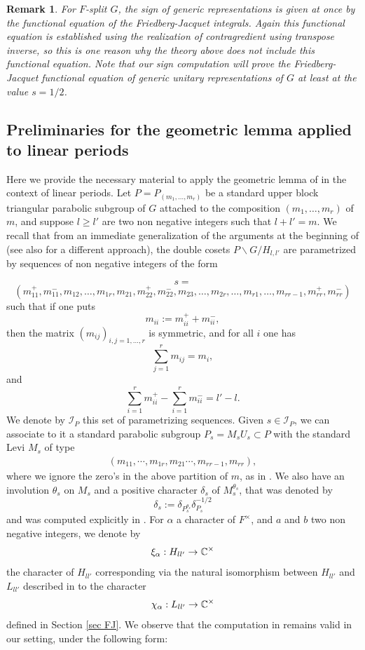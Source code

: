\documentclass[11pt,letterpaper]{amsart}
\newcommand{\CI}{{\mathcal {I}}} \newcommand{\CJ}{{\mathcal {J}}}\newcommand{\CK}{{\mathcal {K}}}\newcommand{\CL}{{\mathcal {L}}}
\theoremstyle{plain}
\newtheorem {rem}[thm]{Remark} \newtheorem{ex}[thm]{Example}
\numberwithin{equation}{section}
\begin{document}
\begin{rem}
For $F$-split $G$, the sign of generic representations is given at once by the functional equation of the Friedberg-Jacquet integrals. Again this functional equation is established using the realization of contragredient using transpose inverse, so this is one reason why the theory above does not include this functional equation. Note that our sign computation will prove the Friedberg-Jacquet functional equation of generic unitary representations of $G$ at least at the value $s=1/2$.  
\end{rem}

\subsection{Preliminaries for the geometric lemma applied to linear periods}\label{sec geom lem prelim}

Here we provide the necessary material to apply the geometric lemma of \cite[Corollary 5.2]{OJNT} in the context of linear periods. Let $P=P_{(m_1,\dots,m_r)}$ be a standard upper block triangular parabolic subgroup of $G$ attached to the composition $(m_1,\dots,m_r)$ of $m$, and suppose $l\geq l'$ are two non negative integers such that $l+l'=m$. We recall that from an immediate generalization of the arguments at the beginning of \cite[Section 3]{MatCRELLE} (see also \cite{Yunitary} for a different approach), the double cosets 
$P\backslash G/ H_{l,l'}$ are parametrized by sequences of non negative integers of the form 

\[s=\] 
\[(m_{11}^+,m_{11}^-,m_{12},\dots, m_{1r}, m_{21},m_{22}^+,m_{22}^-,m_{23},\dots,m_{2r},\dots,m_{r1},\dots,m_{rr-1},m_{rr}^+,m_{rr}^-)\] such that if one puts \[m_{ii}:=m_{ii}^+ + m_{ii}^-,\] then the matrix $(m_{ij})_{i,j=1,\dots,r}$ is symmetric, and for all $i$ one has \[\sum_{j=1}^r m_{ij}=m_i,\] and \[\sum_{i=1}^r m_{ii}^+-\sum_{i=1}^r m_{ii}^-=l'-l.\]
We denote by $\CI_P$ this set of parametrizing sequences. Given $s \in \CI_P$, we can associate to it a standard parabolic subgroup $P_s = M_sU_s \subset P$ with the standard Levi $M_s$ of type
\begin{align*}
	(m_{11},\cdots,m_{1r},m_{21}\cdots,m_{rr-1},m_{rr}),
\end{align*} where we ignore the zero's in the above partition of $m$, as in \cite[Section 3]{MatCRELLE}. 
We also have an involution $\theta_s$ on $M_s$ and a positive character $\delta_s$ of $M_s^{\theta_s}$, that was denoted by 
\[\delta_s:=\delta_{P_s^{\theta_s}} \delta_{P_s}^{-1/2}\] and was computed explicitly in \cite[Proposition 3.6]{MatCRELLE}. For $\alpha$ a character of $F^\times$, and $a$ and $b$ two non negative integers, we denote by 
\[\xi_{\alpha}:H_{ll'}\to {\mathbb {C}}^\times\] the character of $H_{ll'}$ corresponding via the natural isomorphism between $H_{ll'}$ and $L_{ll'}$ described in \cite[Section 2]{MatJNT} to the character 
\[\chi_{\alpha}:L_{ll'}\to {\mathbb {C}}^\times \] defined in Section \ref{sec FJ}. We observe that the computation in \cite[Proposition 3.6]{MatCRELLE} remains valid in our setting, under the following form:
\end{document}
